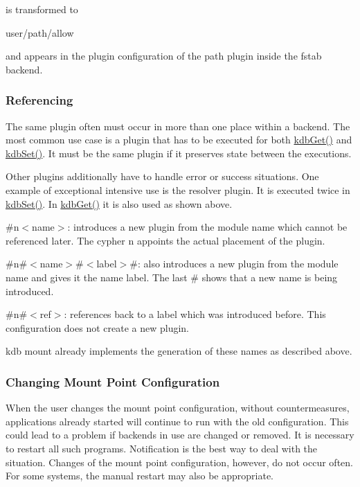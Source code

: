 is transformed to \begin{DoxyVerb}    user/path/allow
\end{DoxyVerb}


and appears in the plugin configuration of the path plugin inside the fstab backend.

\subsubsection*{Referencing}

The same plugin often must occur in more than one place within a backend. The most common use case is a plugin that has to be executed for both {\ttfamily \hyperlink{group__kdb_ga28e385fd9cb7ccfe0b2f1ed2f62453a1}{kdb\+Get()}} and {\ttfamily \hyperlink{group__kdb_ga11436b058408f83d303ca5e996832bcf}{kdb\+Set()}}. It must be the same plugin if it preserves state between the executions.

Other plugins additionally have to handle error or success situations. One example of exceptional intensive use is the resolver plugin. It is executed twice in {\ttfamily \hyperlink{group__kdb_ga11436b058408f83d303ca5e996832bcf}{kdb\+Set()}}. In {\ttfamily \hyperlink{group__kdb_ga28e385fd9cb7ccfe0b2f1ed2f62453a1}{kdb\+Get()}} it is also used as shown above.


\begin{DoxyItemize}
\item {\ttfamily \#n$<$name$>$}\+: introduces a new plugin from the module {\ttfamily name} which cannot be referenced later. The cypher {\ttfamily n} appoints the actual placement of the plugin.
\item {\ttfamily \#n\#$<$name$>$\#$<$label$>$\#}\+: also introduces a new plugin from the module {\ttfamily name} and gives it the name {\ttfamily label}. The last {\ttfamily \#} shows that a new name is being introduced.
\item {\ttfamily \#n\#$<$ref$>$}\+: references back to a label which was introduced before. This configuration does not create a new plugin.
\end{DoxyItemize}

{\ttfamily kdb mount} already implements the generation of these names as described above.

\subsubsection*{Changing Mount Point Configuration}

When the user changes the mount point configuration, without countermeasures, applications already started will continue to run with the old configuration. This could lead to a problem if backends in use are changed or removed. It is necessary to restart all such programs. Notification is the best way to deal with the situation. Changes of the mount point configuration, however, do not occur often. For some systems, the manual restart may also be appropriate.

